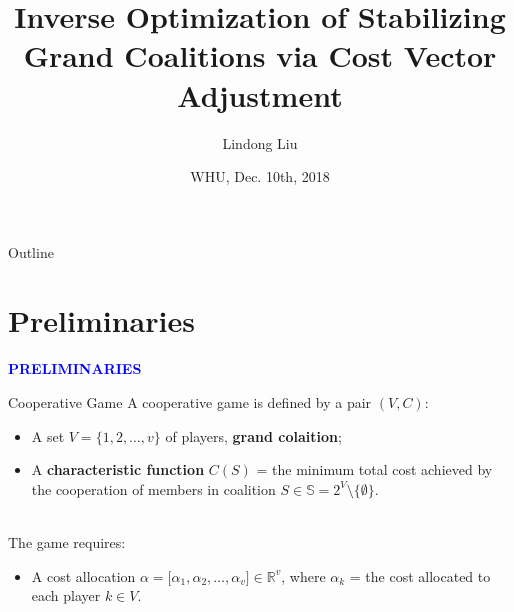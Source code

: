 \documentclass[14pt]{beamer}
\title[Stabilization via Cost Adjustment]
{%
	\large
Inverse Optimization of Stabilizing Grand Coalitions via Cost Vector Adjustment%
}
\author[Lindong Liu] %
{   %
  Lindong Liu
}
\date
{WHU, Dec. 10th, 2018}
\institute[] %
{\footnotesize
	School of Management\\
	University of Science and Technology of China\\
    \vspace{10mm}	
	Co-authored with Xiangtong Qi (HKUST) and Zhou Xu (HKPU)
	\vspace{8mm}
}
\newcommand{\R}{\mathbb{R}}
\begin{document}
\begin{frame}
  \titlepage
\end{frame}


\begin{frame}{Outline}
\tableofcontents
\end{frame}

\section{Preliminaries}
\begin{frame}
\centering
\large
\textcolor{blue}{\bf {\huge P}RELIMINARIES}
\end{frame}
\begin{frame}{Cooperative Game}
A cooperative game is defined by a pair $(V,C)$:
\begin{itemize}
\justifying
	\item A set $V = \big\{1,2,\ldots,v\big\}$ of players, \textbf{grand colaition};
	\item A \textbf{characteristic function} $C(S)$ = the minimum total cost achieved by the cooperation of members in coalition $S \in \mathbb{S}=2^V \setminus \{\emptyset\}$.
\end{itemize}

~\\The game requires:
\begin{itemize}
\justifying
	\item A cost allocation $\alpha=\big[\alpha_1,\alpha_2,\ldots,\alpha_v \big] \in \R^v$, where $\alpha_k$ = the cost allocated to each player $k\in V$.
\end{itemize}
\end{frame}
\end{document}
